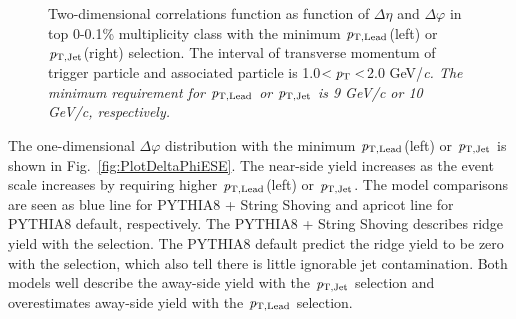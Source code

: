 \begin{figure}[h!]
	\centering
	\caption{ Two-dimensional correlations function as function of $\Delta\eta$ and $\Delta\varphi$ in top 0-0.1\% multiplicity class with the minimum $\it{p}_{\rm{T, Lead}}$(left) or $\it{p}_{\rm{T, Jet}}$(right) selection. The interval of transverse momentum of trigger particle and associated particle is 1.0$<\it{p}_{\rm{T}}<$2.0 GeV/\it{c}\rm{}. The minimum requirement for $\it{p}_{\rm{T, Lead}}$ or $\it{p}_{\rm{T, Jet}}$ is 9 GeV/\it{c}\rm{} or 10 GeV/\it{c}\rm{}, respectively. }
	\label{fig:PlotCorrHMTSel}
\end{figure}

The one-dimensional $\Delta\varphi$ distribution with the minimum $\it{p}_{\rm{T, Lead}}$(left) or $\it{p}_{\rm{T, Jet}}$ is shown in Fig.~\ref{fig:PlotDeltaPhiESE}. The near-side yield increases as the event scale increases by requiring higher $\it{p}_{\rm{T, Lead}}$(left) or $\it{p}_{\rm{T, Jet}}$. The model comparisons are seen as blue line for PYTHIA8 + String Shoving and apricot line for PYTHIA8 default, respectively. The PYTHIA8 + String Shoving describes ridge yield with the selection. The PYTHIA8 default predict the ridge yield to be zero with the selection, which also tell there is little ignorable jet contamination. Both models well describe the away-side yield with the $\it{p}_{\rm{T, Jet}}$ selection and overestimates away-side yield with the $\it{p}_{\rm{T, Lead}}$ selection.

